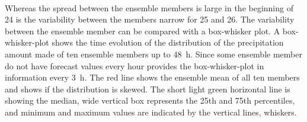 \\
Whereas the spread between the ensemble members is large in the beginning of \SI{24}{\dec} is the variability between the members narrow for \num{25} and \SI{26}{\dec}. The variability between the ensemble member can be compared with a box-whisker plot. A box-whisker-plot shows the time evolution of the distribution of the precipitation amount made of ten ensemble members up to \SI{48}{\hour}. Since some ensemble member do not have forecast values every hour provides the box-whisker-plot in  information every \SI{3}{\hour}. The red line shows the ensemble mean of all ten members and shows if the distribution is skewed. The short light green horizontal line is showing the median, wide vertical box represents the 25th and 75th percentiles, and minimum and maximum values are indicated by the vertical lines, whiskers.
\\
